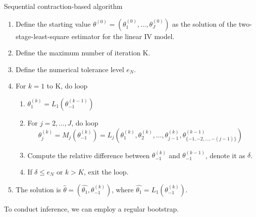 \begin{algorithm}[H]\caption{Sequential contraction-based algorithm}
\label{algo:seq}
\begin{enumerate}
	
\item Define the starting value $\theta^{(0)} = (\theta_1^{(0)}, \ldots,
\theta_J^{(0)})$ as the solution of the two-stage-least-square estimator for the
linear IV model.

\item Define the maximum number of iteration K.

\item Define the numerical tolerance level $e_N$.

\item For $k = 1$ to K, do loop
	
\begin{enumerate}
\item $\theta_1^{(k)} = L_1(\theta_{-1}^{(k-1)})$
\item For $j=2, \ldots, J$, do loop
$$
\theta_j^{(k)} = M_j(\theta_{-1}^{(k)}) = L_j
	\left(
	\theta_1^{(k)}, \theta_2^{(k)}, \ldots, \theta_{j-1}^{(k)}, 
	\theta_{\{-1, -2, \ldots, -(j-1)\}}^{(k-1)}
	\right)
$$
\item Compute the relative difference between $\theta_{-1}^{(k)}$ and
$\theta_{-1}^{(k-1)}$, denote it as $\delta$.

\item If $\delta \leq e_N$ or $k > K$, exit the loop.

\end{enumerate}

\item The solution is $\hat{\theta} = (\hat{\theta_1}, \theta_{-1}^{(k)})$, where
$\hat{\theta_1} = L_1(\theta_{-1}^{(k)})$.
\end{enumerate}

\end{algorithm}

\vskip 1cm

To conduct inference, we can employ a regular bootstrap.

\vskip 1cm

